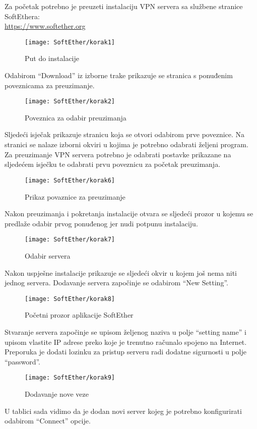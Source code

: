 \hfill \smallbreak
Za početak potrebno je preuzeti instalaciju VPN servera sa službene stranice SoftEthera:\\ \url{https://www.softether.org}
\begin{figure}[h!]
	\centering
     \texttt{[image: SoftEther/korak1]}
     \caption{Put do instalacije}
\end{figure}
\FloatBarrier
Odabirom ``Download'' iz izborne trake prikazuje se stranica s ponuđenim poveznicama za preuzimanje.
\begin{figure}[h!]
     \centering
     \texttt{[image: SoftEther/korak2]}
     \caption{Poveznica za odabir preuzimanja}
\end{figure}
\FloatBarrier
Sljedeći isječak prikazuje stranicu koja se otvori odabirom prve poveznice. Na stranici se nalaze izborni okviri u kojima je potrebno odabrati željeni program. Za preuzimanje VPN servera potrebno je odabrati postavke prikazane na sljedećem isječku te odabrati prvu poveznicu za početak preuzimanja.
\begin{figure}[h!]
     \centering
     \texttt{[image: SoftEther/korak6]}
     \caption{Prikaz povaznice za preuzimanje}
\end{figure}
\FloatBarrier
Nakon preuzimanja i pokretanja instalacije otvara se sljedeći prozor u kojemu se predlaže odabir prvog ponuđenog jer nudi potpunu instalaciju.
\begin{figure}[h!]
     \centering
     \texttt{[image: SoftEther/korak7]}
     \caption{Odabir servera}
\end{figure}
\FloatBarrier
Nakon uspješne instalacije prikazuje se sljedeći okvir u kojem još nema niti jednog servera. Dodavanje servera započinje se odabirom ``New Setting''.
\begin{figure}[h!]
     \centering
     \texttt{[image: SoftEther/korak8]}
     \caption{Početni prozor aplikacije SoftEther}
\end{figure}
\FloatBarrier
Stvaranje servera započinje se upisom željenog naziva u polje ``setting name'' i upisom vlastite IP adrese preko koje je trenutno računalo spojeno na Internet. Preporuka je dodati lozinku za pristup serveru radi dodatne sigurnosti u polje ``password''.
\begin{figure}[h!]
     \centering
     \texttt{[image: SoftEther/korak9]}
     \caption{Dodavanje nove veze}
\end{figure}
\FloatBarrier
U tablici sada vidimo da je dodan novi server kojeg je potrebno konfigurirati odabirom ``Connect'' opcije.

